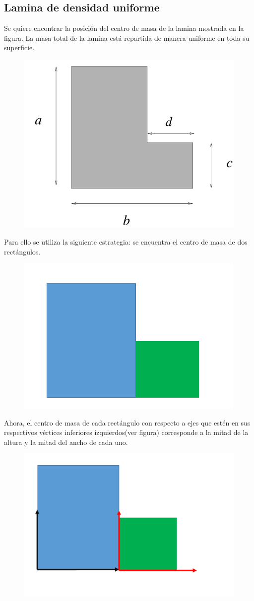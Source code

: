 \documentclass[a4paper,11pt]{article}
\theoremstyle{mytheor}
\begin{document}
\subsection{Lamina de densidad uniforme} 

Se quiere encontrar la posición del centro de masa de la lamina mostrada en la figura. La masa total
de la lamina está repartida de manera uniforme en toda su superficie. 
\begin{figure}[h]
	\includegraphics[width=0.7\linewidth]{4}
	\label{fcN4}
\end{figure}

Para ello se utiliza la siguiente estrategia: se encuentra el centro de masa de dos rectángulos.

\begin{figure}[h]
	\includegraphics[width=0.7\linewidth]{recdiv}
	\label{fcN4}
\end{figure}

Ahora, el centro de masa de cada rectángulo con respecto a ejes que estén en sus respectivos vértices inferiores izquierdos(ver figura) corresponde a la mitad de la altura y la mitad del ancho de cada uno.

\begin{figure}[h]
	\includegraphics[width=0.7\linewidth]{vert}
	\label{fcN4}
\end{figure}
\end{document}
